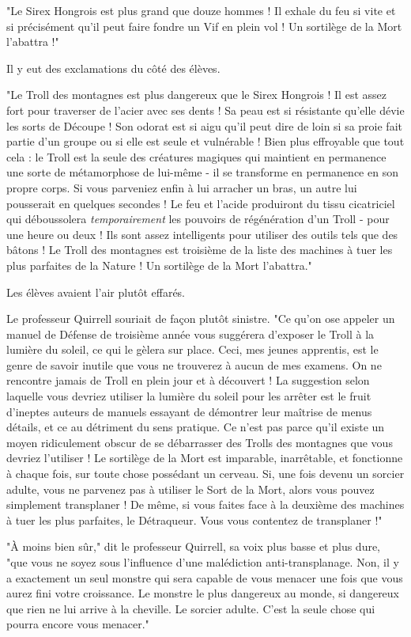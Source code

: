 "Le Sirex Hongrois est plus grand que douze hommes ! Il exhale du feu si vite et si précisément qu'il peut faire fondre un Vif en plein vol ! Un sortilège de la Mort l'abattra !"

Il y eut des exclamations du côté des élèves.

"Le Troll des montagnes est plus dangereux que le Sirex Hongrois ! Il est assez fort pour traverser de l'acier avec ses dents ! Sa peau est si résistante qu'elle dévie les sorts de Découpe ! Son odorat est si aigu qu'il peut dire de loin si sa proie fait partie d'un groupe ou si elle est seule et vulnérable ! Bien plus effroyable que tout cela : le Troll est la seule des créatures magiques qui maintient en permanence une sorte de métamorphose de lui-même - il se transforme en permanence en son propre corps. Si vous parveniez enfin à lui arracher un bras, un autre lui pousserait en quelques secondes ! Le feu et l'acide produiront du tissu cicatriciel qui déboussolera \emph{temporairement}  les pouvoirs de régénération d'un Troll - pour une heure ou deux ! Ils sont assez intelligents pour utiliser des outils tels que des bâtons ! Le Troll des montagnes est troisième de la liste des machines à tuer les plus parfaites de la Nature ! Un sortilège de la Mort l'abattra."

Les élèves avaient l'air plutôt effarés.

Le professeur Quirrell souriait de façon plutôt sinistre. "Ce qu'on ose appeler un manuel de Défense de troisième année vous suggérera d'exposer le Troll à la lumière du soleil, ce qui le gèlera sur place. Ceci, mes jeunes apprentis, est le genre de savoir inutile que vous ne trouverez à aucun de mes examens. On ne rencontre jamais de Troll en plein jour et à découvert ! La suggestion selon laquelle vous devriez utiliser la lumière du soleil pour les arrêter est le fruit d'ineptes auteurs de manuels essayant de démontrer leur maîtrise de menus détails, et ce au détriment du sens pratique. Ce n'est pas parce qu'il existe un moyen ridiculement obscur de se débarrasser des Trolls des montagnes que vous devriez l'utiliser ! Le sortilège de la Mort est imparable, inarrêtable, et fonctionne à chaque fois, sur toute chose possédant un cerveau. Si, une fois devenu un sorcier adulte, vous ne parvenez pas à utiliser le Sort de la Mort, alors vous pouvez simplement transplaner ! De même, si vous faites face à la deuxième des machines à tuer les plus parfaites, le Détraqueur. Vous vous contentez de transplaner !"

"À moins bien sûr," dit le professeur Quirrell, sa voix plus basse et plus dure, "que vous ne soyez sous l'influence d'une malédiction anti-transplanage. Non, il y a exactement un seul monstre qui sera capable de vous menacer une fois que vous aurez fini votre croissance. Le monstre le plus dangereux au monde, si dangereux que rien ne lui arrive à la cheville. Le sorcier adulte. C'est la seule chose qui pourra encore vous menacer."

